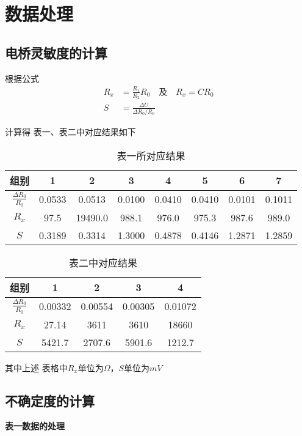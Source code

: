 \documentclass[UTF8]{ctexart}
\begin{document}
\section{数据处理}

\subsection{电桥灵敏度的计算}

根据公式 
\begin{align*}
    R_x &= \frac{R_1}{R_2}R_0   \quad  \text{及}  \quad R_x = CR_0 \\
    S &= \frac{\Delta U}{\Delta R_0 /R_0} 
\end{align*}

计算得
表一、表二中对应结果如下
\begin{table}[H]
    \centering
    \caption*{表一所对应结果}
    \begin{tabular}{|c|c|c|c|c|c|c|c|}
    \hline
        组别 & 1 & 2 & 3 & 4 & 5  & 6 & 7  \\
    \hline
        $\frac{ \Delta R_0}{R_0}$ &  0.0533 & 0.0513 & 0.0100 & 0.0410 & 0.0410 & 0.0101 & 0.1011 \\
    \hline
        $R_x$  &  97.5 &  19490.0  & 988.1  &  976.0  &  975.3 &  987.6 
& 989.0 \\
    \hline
        $S$ & 0.3189 & 0.3314 &  1.3000 & 0.4878 & 0.4146 & 1.2871 & 1.2859 \\
    \hline
    \end{tabular}
\end{table}
\begin{table}[H]
    \centering
    \caption*{表二中对应结果}
    \begin{tabular}{|c|c|c|c|c|}
    \hline
       组别  &  1 & 2 & 3 &  4   \\
    \hline
       $\frac{ \Delta R_0}{R_0}$  & 0.00332 & 0.00554 & 0.00305 & 0.01072  \\
    \hline
        $R_x$  & 27.14 & 3611 & 3610 & 18660 \\
    \hline
        $S$ & 5421.7 & 2707.6 & 5901.6 & 1212.7 \\
    \hline
    \end{tabular}
\end{table}
其中上述 表格中$R_x$单位为$\Omega$，$S$单位为$mV$

\newpage

\subsection{不确定度的计算}
\textbf{表一数据的处理}
\end{document}
